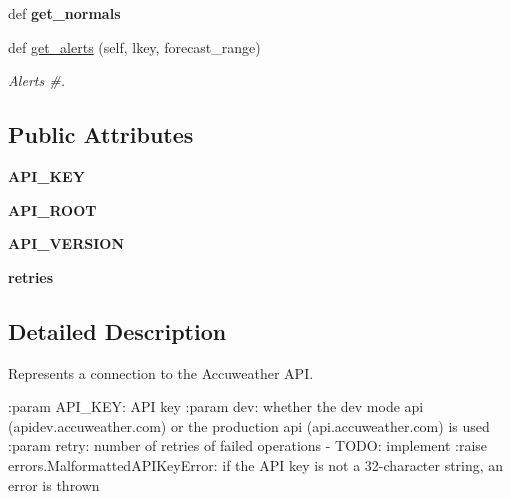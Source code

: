 \begin{DoxyCompactItemize}
\item 
\hypertarget{classpyccuweather_1_1connector_1_1_connection_a5bca5ef6b2e462494948ae6d470bf4dd}{}def {\bfseries get\+\_\+normals}\label{classpyccuweather_1_1connector_1_1_connection_a5bca5ef6b2e462494948ae6d470bf4dd}

\item 
\hypertarget{classpyccuweather_1_1connector_1_1_connection_a23e9c86deb0e1234164aab99d6a765e7}{}def \hyperlink{classpyccuweather_1_1connector_1_1_connection_a23e9c86deb0e1234164aab99d6a765e7}{get\+\_\+alerts} (self, lkey, forecast\+\_\+range)\label{classpyccuweather_1_1connector_1_1_connection_a23e9c86deb0e1234164aab99d6a765e7}

\begin{DoxyCompactList}\small\item\em Alerts \#. \end{DoxyCompactList}\end{DoxyCompactItemize}
\subsection*{Public Attributes}
\begin{DoxyCompactItemize}
\item 
\hypertarget{classpyccuweather_1_1connector_1_1_connection_ab347ecfa9178e686fb17b8257fa612fa}{}{\bfseries A\+P\+I\+\_\+\+K\+E\+Y}\label{classpyccuweather_1_1connector_1_1_connection_ab347ecfa9178e686fb17b8257fa612fa}

\item 
\hypertarget{classpyccuweather_1_1connector_1_1_connection_a79bc370745ff57953bd5171d15d9730e}{}{\bfseries A\+P\+I\+\_\+\+R\+O\+O\+T}\label{classpyccuweather_1_1connector_1_1_connection_a79bc370745ff57953bd5171d15d9730e}

\item 
\hypertarget{classpyccuweather_1_1connector_1_1_connection_a5bbe33c3ad892efaec950ffd3d9e5b71}{}{\bfseries A\+P\+I\+\_\+\+V\+E\+R\+S\+I\+O\+N}\label{classpyccuweather_1_1connector_1_1_connection_a5bbe33c3ad892efaec950ffd3d9e5b71}

\item 
\hypertarget{classpyccuweather_1_1connector_1_1_connection_aaf21fd5e7b1adc7acaeaeb5700350513}{}{\bfseries retries}\label{classpyccuweather_1_1connector_1_1_connection_aaf21fd5e7b1adc7acaeaeb5700350513}

\end{DoxyCompactItemize}


\subsection{Detailed Description}
\begin{DoxyVerb}Represents a connection to the Accuweather API.

:param API_KEY: API key
:param dev: whether the dev mode api (apidev.accuweather.com) or the production api (api.accuweather.com) is used
:param retry: number of retries of failed operations - TODO: implement
:raise errors.MalformattedAPIKeyError: if the API key is not a 32-character string, an error is thrown
\end{DoxyVerb}
 

